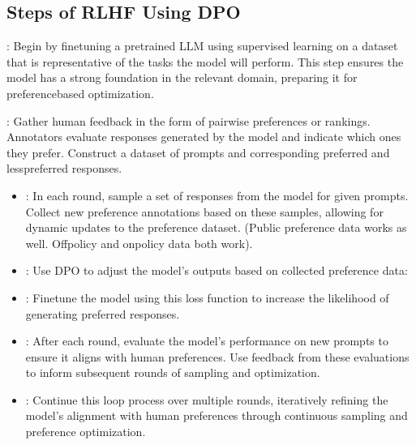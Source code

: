 \documentclass[letterpaper,11pt,english]{sphinxmanual}
\begin{document}
\subsection{Steps of RLHF Using DPO}
\label{\detokenize{rlhf:steps-of-rlhf-using-dpo}}
\sphinxAtStartPar
{}: Begin by
fine\sphinxhyphen{}tuning a pre\sphinxhyphen{}trained LLM using supervised learning on a dataset
that is representative of the tasks the model will perform. This step
ensures the model has a strong foundation in the relevant domain,
preparing it for preference\sphinxhyphen{}based optimization.

\sphinxAtStartPar
{}: Gather human feedback in the form of
pairwise preferences or rankings. Annotators evaluate responses
generated by the model and indicate which ones they prefer. Construct a
dataset of prompts and corresponding preferred and less\sphinxhyphen{}preferred
responses.

\sphinxAtStartPar
{}
\begin{itemize}
\item {} 
\sphinxAtStartPar
{}: In each round, sample a set of responses
from the model for given prompts. Collect new preference annotations
based on these samples, allowing for dynamic updates to the preference
dataset. (Public preference data works as well. Off\sphinxhyphen{}policy and
on\sphinxhyphen{}policy data both work).

\item {} 
\sphinxAtStartPar
{}: Use DPO to adjust the model’s outputs
based on collected preference data:

\item {} 
\sphinxAtStartPar
{}: Fine\sphinxhyphen{}tune the model using this loss function to
increase the likelihood of generating preferred responses.

\end{itemize}

\sphinxAtStartPar
{}
\begin{itemize}
\item {} 
\sphinxAtStartPar
{}: After each round, evaluate the model’s
performance on new prompts to ensure it aligns with human preferences.
Use feedback from these evaluations to inform subsequent rounds of
sampling and optimization.

\item {} 
\sphinxAtStartPar
{}: Continue this loop process over multiple
rounds, iteratively refining the model’s alignment with human
preferences through continuous sampling and preference optimization.

\end{itemize}
\end{document}
